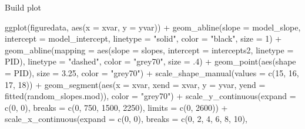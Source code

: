 \documentclass[
]{article}
\newenvironment{Shaded}{\begin{snugshade}}{\end{snugshade}}
\newcommand{\AttributeTok}[1]{\textcolor[rgb]{0.77,0.63,0.00}{#1}}
\newcommand{\DecValTok}[1]{\textcolor[rgb]{0.00,0.00,0.81}{#1}}
\newcommand{\FloatTok}[1]{\textcolor[rgb]{0.00,0.00,0.81}{#1}}
\newcommand{\FunctionTok}[1]{\textcolor[rgb]{0.00,0.00,0.00}{#1}}
\newcommand{\NormalTok}[1]{#1}
\newcommand{\SpecialCharTok}[1]{\textcolor[rgb]{0.00,0.00,0.00}{#1}}
\newcommand{\StringTok}[1]{\textcolor[rgb]{0.31,0.60,0.02}{#1}}
\begin{document}
Build plot

\begin{Shaded}
\begin{Highlighting}[]
\FunctionTok{ggplot}\NormalTok{(figuredata, }\FunctionTok{aes}\NormalTok{(}\AttributeTok{x =}\NormalTok{ xvar, }\AttributeTok{y =}\NormalTok{ yvar)) }\SpecialCharTok{+} 
  \FunctionTok{geom\_abline}\NormalTok{(}\AttributeTok{slope =}\NormalTok{ model\_slope, }\AttributeTok{intercept =}\NormalTok{ model\_intercept, }
              \AttributeTok{linetype =} \StringTok{"solid"}\NormalTok{, }\AttributeTok{color =} \StringTok{"black"}\NormalTok{, }\AttributeTok{size =} \DecValTok{1}\NormalTok{) }\SpecialCharTok{+} 
  \FunctionTok{geom\_abline}\NormalTok{(}\AttributeTok{mapping =} \FunctionTok{aes}\NormalTok{(}\AttributeTok{slope =}\NormalTok{ slopes, }
                            \AttributeTok{intercept =}\NormalTok{ intercepts2, }\AttributeTok{linetype =}\NormalTok{ PID), }
              \AttributeTok{linetype =} \StringTok{"dashed"}\NormalTok{, }\AttributeTok{color =} \StringTok{"grey70"}\NormalTok{, }\AttributeTok{size =}\NormalTok{ .}\DecValTok{4}\NormalTok{) }\SpecialCharTok{+}
  \FunctionTok{geom\_point}\NormalTok{(}\FunctionTok{aes}\NormalTok{(}\AttributeTok{shape =}\NormalTok{ PID), }\AttributeTok{size =} \FloatTok{3.25}\NormalTok{, }\AttributeTok{color =} \StringTok{"grey70"}\NormalTok{) }\SpecialCharTok{+} 
  \FunctionTok{scale\_shape\_manual}\NormalTok{(}\AttributeTok{values =} \FunctionTok{c}\NormalTok{(}\DecValTok{15}\NormalTok{, }\DecValTok{16}\NormalTok{, }\DecValTok{17}\NormalTok{, }\DecValTok{18}\NormalTok{)) }\SpecialCharTok{+} 
  \FunctionTok{geom\_segment}\NormalTok{(}\FunctionTok{aes}\NormalTok{(}\AttributeTok{x =}\NormalTok{ xvar, }\AttributeTok{xend =}\NormalTok{ xvar, }
                   \AttributeTok{y =}\NormalTok{ yvar, }\AttributeTok{yend =} \FunctionTok{fitted}\NormalTok{(random\_slopes.mod)), }
               \AttributeTok{color =} \StringTok{"grey70"}\NormalTok{) }\SpecialCharTok{+}
  \FunctionTok{scale\_y\_continuous}\NormalTok{(}\AttributeTok{expand =} \FunctionTok{c}\NormalTok{(}\DecValTok{0}\NormalTok{, }\DecValTok{0}\NormalTok{), }\AttributeTok{breaks =} \FunctionTok{c}\NormalTok{(}\DecValTok{0}\NormalTok{, }\DecValTok{750}\NormalTok{, }\DecValTok{1500}\NormalTok{, }\DecValTok{2250}\NormalTok{), }
                     \AttributeTok{limits =} \FunctionTok{c}\NormalTok{(}\DecValTok{0}\NormalTok{, }\DecValTok{2600}\NormalTok{)) }\SpecialCharTok{+}
  \FunctionTok{scale\_x\_continuous}\NormalTok{(}\AttributeTok{expand =} \FunctionTok{c}\NormalTok{(}\DecValTok{0}\NormalTok{, }\DecValTok{0}\NormalTok{), }\AttributeTok{breaks =} \FunctionTok{c}\NormalTok{(}\DecValTok{0}\NormalTok{, }\DecValTok{2}\NormalTok{, }\DecValTok{4}\NormalTok{, }\DecValTok{6}\NormalTok{, }\DecValTok{8}\NormalTok{, }\DecValTok{10}\NormalTok{), }

\end{Highlighting}
\end{Shaded}
\end{document}
